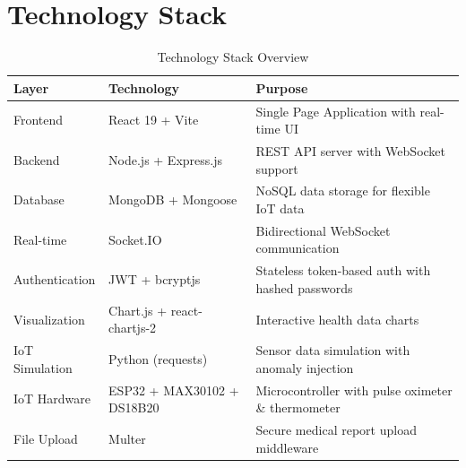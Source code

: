 \section{Technology Stack}
\begin{table}[H]
\centering
\caption{Technology Stack Overview}
\label{tab:techstack}
\begin{tabular}{|l|l|p{6cm}|}
\hline
\textbf{Layer} & \textbf{Technology} & \textbf{Purpose} \\
\hline
Frontend & React 19 + Vite & Single Page Application with real-time UI \\
\hline
Backend & Node.js + Express.js & REST API server with WebSocket support \\
\hline
Database & MongoDB + Mongoose & NoSQL data storage for flexible IoT data \\
\hline
Real-time & Socket.IO & Bidirectional WebSocket communication \\
\hline
Authentication & JWT + bcryptjs & Stateless token-based auth with hashed passwords \\
\hline
Visualization & Chart.js + react-chartjs-2 & Interactive health data charts \\
\hline
IoT Simulation & Python (requests) & Sensor data simulation with anomaly injection \\
\hline
IoT Hardware & ESP32 + MAX30102 + DS18B20 & Microcontroller with pulse oximeter \& thermometer \\
\hline
File Upload & Multer & Secure medical report upload middleware \\
\hline
\end{tabular}
\end{table}
